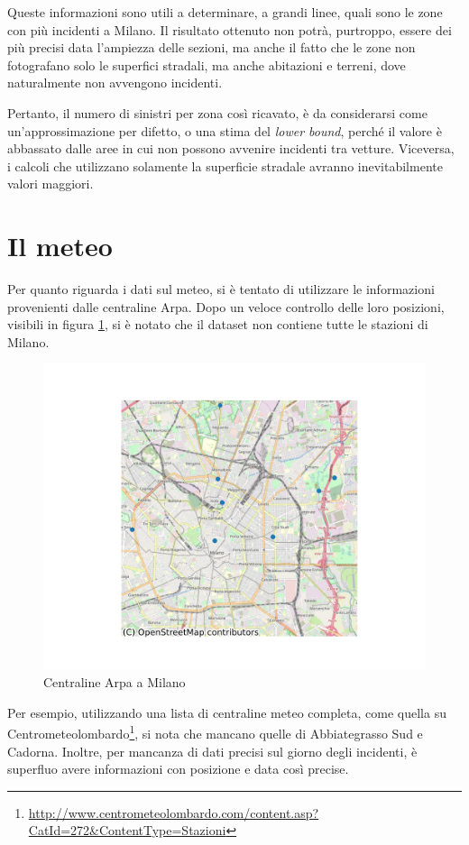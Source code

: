 \documentclass[a4paper,12pt]{report}
\newcommand{\quotestyle}[1]{\textit{#1}}
\begin{document}
Queste informazioni sono utili a determinare, a grandi linee, quali sono le zone 
con più incidenti a Milano. 
Il risultato ottenuto non potrà, purtroppo, essere dei più precisi data l'ampiezza 
delle sezioni, ma anche il fatto che le zone non fotografano solo le superfici stradali, 
ma anche abitazioni e terreni, dove naturalmente non avvengono incidenti. 

Pertanto, il numero di sinistri per zona così ricavato, 
è da considerarsi come un'approssimazione per difetto, o una stima del 
\quotestyle{lower bound}, perché il valore è abbassato dalle aree in cui non 
possono avvenire incidenti tra vetture. 
Viceversa, i calcoli che utilizzano solamente la superficie stradale avranno 
inevitabilmente valori maggiori. 

\section{Il meteo}

Per quanto riguarda i dati sul meteo, si è tentato di utilizzare le informazioni 
provenienti dalle centraline Arpa. 
Dopo un veloce controllo delle loro posizioni, visibili in figura \ref{fig:centraline-arpa}, 
si è notato che il dataset non contiene tutte le stazioni di Milano. 

\begin{figure}
    \hfill\includegraphics[width=0.7\linewidth]{../src/meteo/centraline_arpa.png}\hspace*{\fill}
    \caption{Centraline Arpa a Milano}
    \label{fig:centraline-arpa}
\end{figure}

Per esempio, utilizzando una lista di centraline meteo completa, come quella su 
Centrometeolombardo\footnote{\url{http://www.centrometeolombardo.com/content.asp?CatId=272&ContentType=Stazioni}}, 
si nota che mancano quelle di Abbiategrasso Sud e Cadorna. 
Inoltre, per mancanza di dati precisi sul giorno degli incidenti, 
è superfluo avere informazioni con posizione e data così precise. 
\end{document}
